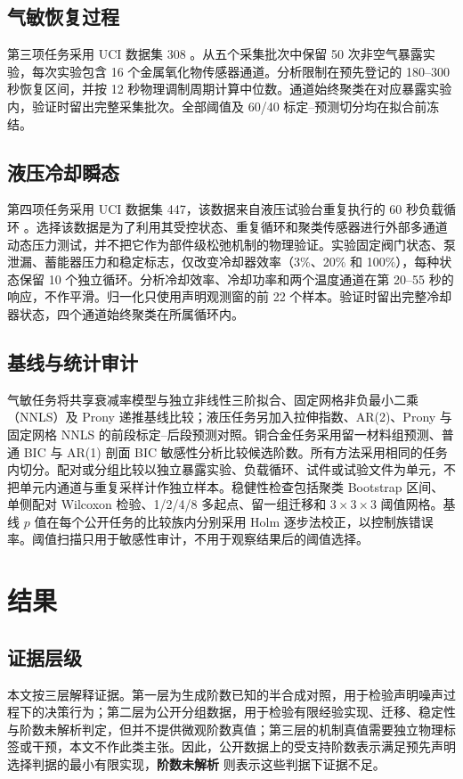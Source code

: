 \documentclass[UTF8,11pt]{ctexart}
\newcommand{\indet}{\textup{\bfseries 阶数未解析}}
\begin{document}
\subsection{气敏恢复过程}
第三项任务采用 UCI 数据集 308 \cite{ziyatdinov2015dataset}。从五个采集批次中保留 50 次非空气暴露实验，每次实验包含 16 个金属氧化物传感器通道。分析限制在预先登记的 180--300 秒恢复区间，并按 12 秒物理调制周期计算中位数。通道始终聚类在对应暴露实验内，验证时留出完整采集批次。全部阈值及 60/40 标定--预测切分均在拟合前冻结。

\subsection{液压冷却瞬态}
第四项任务采用 UCI 数据集 447，该数据来自液压试验台重复执行的 60 秒负载循环 \cite{helwig2015hydraulic}。选择该数据是为了利用其受控状态、重复循环和聚类传感器进行外部多通道动态压力测试，并不把它作为部件级松弛机制的物理验证。实验固定阀门状态、泵泄漏、蓄能器压力和稳定标志，仅改变冷却器效率（3\%、20\% 和 100\%），每种状态保留 10 个独立循环。分析冷却效率、冷却功率和两个温度通道在第 20--55 秒的响应，不作平滑。归一化只使用声明观测窗的前 22 个样本。验证时留出完整冷却器状态，四个通道始终聚类在所属循环内。

\subsection{基线与统计审计}
气敏任务将共享衰减率模型与独立非线性三阶拟合、固定网格非负最小二乘（NNLS）及 Prony 递推基线比较；液压任务另加入拉伸指数、AR(2)、Prony 与固定网格 NNLS 的前段标定--后段预测对照。铜合金任务采用留一材料组预测、普通 BIC 与 AR(1) 剖面 BIC 敏感性分析比较候选阶数。所有方法采用相同的任务内切分。配对或分组比较以独立暴露实验、负载循环、试件或试验文件为单元，不把单元内通道与重复采样计作独立样本。稳健性检查包括聚类 Bootstrap 区间、单侧配对 Wilcoxon 检验、1/2/4/8 多起点、留一组迁移和 $3\times3\times3$ 阈值网格。基线 $p$ 值在每个公开任务的比较族内分别采用 Holm 逐步法校正，以控制族错误率。阈值扫描只用于敏感性审计，不用于观察结果后的阈值选择。

\section{结果}
\subsection{证据层级}
本文按三层解释证据。第一层为生成阶数已知的半合成对照，用于检验声明噪声过程下的决策行为；第二层为公开分组数据，用于检验有限经验实现、迁移、稳定性与阶数未解析判定，但并不提供微观阶数真值；第三层的机制真值需要独立物理标签或干预，本文不作此类主张。因此，公开数据上的受支持阶数表示满足预先声明选择判据的最小有限实现，\indet{} 则表示这些判据下证据不足。
\end{document}
